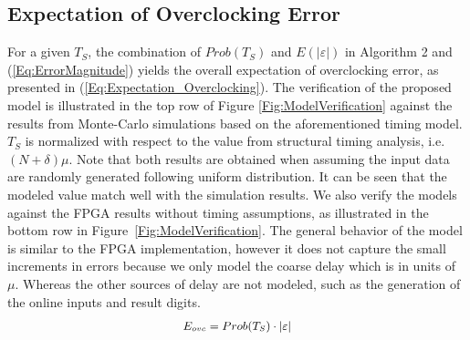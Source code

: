 \documentclass{acm_proc_article-sp}
\begin{document}

\subsection{Expectation of Overclocking Error}\label{Sec:MeanError}
For a given $T_S$, the combination of $Prob(T_S)$ and $E(|\varepsilon|)$ in Algorithm 2 and (\ref{Eq:ErrorMagnitude}) yields the overall expectation of overclocking error, as presented in (\ref{Eq:Expectation_Overclocking}). The verification of the proposed model is illustrated in the top row of Figure \ref{Fig:ModelVerification} against the results from Monte-Carlo simulations based on the aforementioned timing model. $T_S$ is normalized with respect to the value from structural timing analysis, i.e. $(N+\delta)\mu$. Note that both results are obtained when assuming the input data are randomly generated following uniform distribution. It can be seen that the modeled value match well with the simulation results. We also verify the models against the FPGA results without timing assumptions, as illustrated in the bottom row in Figure~\ref{Fig:ModelVerification}.
The general behavior of the model is similar to the FPGA implementation, however it does not capture the small increments in errors because we only model the coarse delay which is in units of $\mu$. Whereas the other sources of delay are not modeled, such as the generation of the online inputs and result digits.
%
\begin{eqnarray}\label{Eq:Expectation_Overclocking}
\scriptsize
  E_{ovc}=Prob(T_S)\cdot |\varepsilon|
\normalsize
\end{eqnarray}
\end{document}
